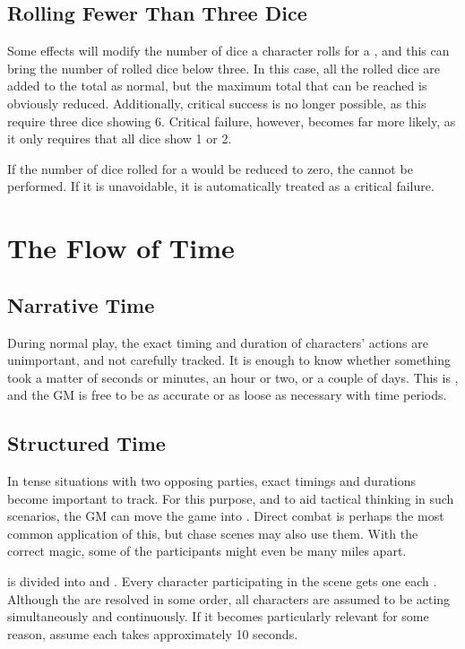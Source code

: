 \subsection{Rolling Fewer Than Three Dice}

Some effects will modify the number of dice a character rolls for a {\test}, and this can bring the number of rolled dice below three.
In this case, all the rolled dice are added to the total as normal, but the maximum total that can be reached is obviously reduced.
Additionally, critical success is no longer possible, as this require three dice showing 6.
Critical failure, however, becomes far more likely, as it only requires that all dice show 1 or 2.

If the number of dice rolled for a {\test} would be reduced to zero, the {\test} cannot be performed.
If it is unavoidable, it is automatically treated as a critical failure.

\section{The Flow of Time}

\subsection{Narrative Time}

During normal play, the exact timing and duration of characters' actions are unimportant, and not carefully tracked.
It is enough to know whether something took a matter of seconds or minutes, an hour or two, or a couple of days.
This is {\narrativetime}, and the GM is free to be as accurate or as loose as necessary with time periods.

\subsection{Structured Time}

In tense situations with two opposing parties, exact timings and durations become important to track.
For this purpose, and to aid tactical thinking in such scenarios, the GM can move the game into {\structuredtime}.
Direct combat is perhaps the most common application of this, but chase scenes may also use them.
With the correct magic, some of the participants might even be many miles apart.

\capital{\structuredtime} is divided into {\rounds} and {\turns}.
Every character participating in the scene gets one {\turn} each {\round}.
Although the {\turns} are resolved in some order, all characters are assumed to be acting simultaneously and continuously.
If it becomes particularly relevant for some reason, assume each {\round} takes approximately 10 seconds.

